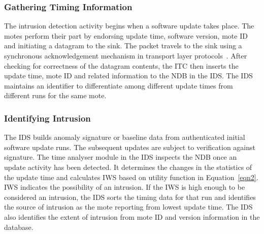 \documentclass[conference,manuscript]{IEEEtran}
\begin{document}
\subsubsection*{Gathering Timing Information}
\label{ssc:ga_info}
The intrusion detection activity begins when a software update takes place.
The motes perform their part by endorsing update time, software version, mote ID  and initiating a datagram to the sink. 
The packet travels to the sink using a synchronous acknowledgement mechanism in transport layer protocols~\cite{tep116}.
After checking for correctness of the datagram contents, the ITC then inserts the update time, mote ID and related information to the NDB in the IDS.
The IDS maintains an identifier to differentiate among different update times from different runs for the same mote.
%

\subsubsection*{Identifying Intrusion}
\label{ssc:cal_iws} 
The IDS builds anomaly signature or baseline data from authenticated initial software update runs. %
The subsequent updates are subject to verification against signature.
The time analyser module in the IDS inspects the NDB once an update activity has been detected.
It determines the changes in the statistics of the update time and calculates IWS based on utility function in Equation~\ref{eqn2}. IWS indicates the possibility of an intrusion. If the IWS is high enough to be considered an intrusion, the IDS sorts the timing data for that run and identifies the source of intrusion as the mote reporting from lowest update time.
The IDS also identifies the extent of intrusion from mote ID and version information in the database.
\end{document}
